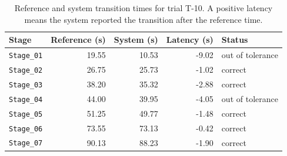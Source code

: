 \begin{table}[htbp]
\centering
\caption{Reference and system transition times for trial T-10. A positive latency means the system reported the transition after the reference time.}
\label{tab:trial-T-10-transitions}
\begin{tabular}{|l|r|r|r|l|}
\hline
\textbf{Stage} & \textbf{Reference (s)} & \textbf{System (s)} & \textbf{Latency (s)} & \textbf{Status} \\
\hline
\texttt{Stage\_01} & 19.55 & 10.53 & -9.02 & out of tolerance \\
\hline
\texttt{Stage\_02} & 26.75 & 25.73 & -1.02 & correct \\
\hline
\texttt{Stage\_03} & 38.20 & 35.32 & -2.88 & correct \\
\hline
\texttt{Stage\_04} & 44.00 & 39.95 & -4.05 & out of tolerance \\
\hline
\texttt{Stage\_05} & 51.25 & 49.77 & -1.48 & correct \\
\hline
\texttt{Stage\_06} & 73.55 & 73.13 & -0.42 & correct \\
\hline
\texttt{Stage\_07} & 90.13 & 88.23 & -1.90 & correct \\
\hline
\end{tabular}
\end{table}
